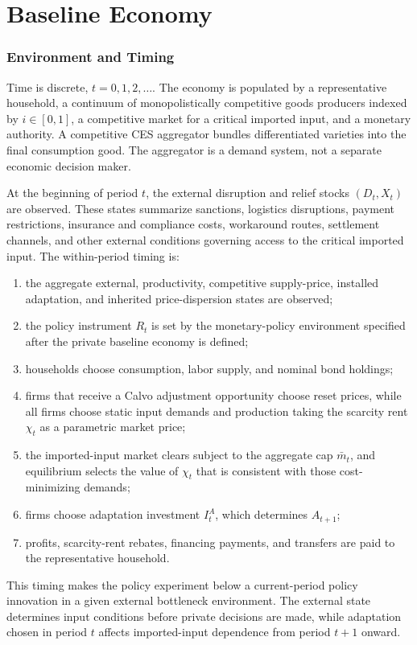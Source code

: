 ﻿\documentclass[12pt]{article}
\theoremstyle{remark}
\begin{document}
\part{Baseline Economy}

\section{Environment and Timing}

Time is discrete, $t=0,1,2,\ldots$. The economy is populated by a representative household, a
continuum of monopolistically competitive goods producers indexed by $i\in[0,1]$, a competitive
market for a critical imported input, and a monetary authority. A competitive CES aggregator
bundles differentiated varieties into the final consumption good. The aggregator is a demand system,
not a separate economic decision maker.

At the beginning of period $t$, the external disruption and relief stocks $(D_t,X_t)$ are observed.
These states summarize sanctions, logistics disruptions, payment restrictions, insurance and
compliance costs, workaround routes, settlement channels, and other external conditions governing
access to the critical imported input. The within-period timing is:
\begin{enumerate}[leftmargin=1.5em]
    \item the aggregate external, productivity, competitive supply-price, installed adaptation,
    and inherited price-dispersion states are observed;
    \item the policy instrument $R_t$ is set by the monetary-policy environment specified after the
    private baseline economy is defined;
    \item households choose consumption, labor supply, and nominal bond holdings;
    \item firms that receive a Calvo adjustment opportunity choose reset prices, while all firms
    choose static input demands and production taking the scarcity rent $\chi_t$ as a parametric
    market price;
    \item the imported-input market clears subject to the aggregate cap $\bar m_t$, and equilibrium
    selects the value of $\chi_t$ that is consistent with those cost-minimizing demands;
    \item firms choose adaptation investment $I_t^A$, which determines $A_{t+1}$;
    \item profits, scarcity-rent rebates, financing payments, and transfers are paid to the
    representative household.
\end{enumerate}
This timing makes the policy experiment below a current-period policy innovation in a given
external bottleneck environment. The external state determines input conditions before private
decisions are made, while adaptation chosen in period $t$ affects imported-input dependence from
period $t+1$ onward.
\end{document}
